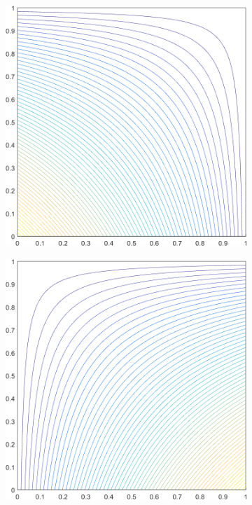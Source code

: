 \begin{figure}
\begin{subfigure}[b]{0.39\textwidth}
		\caption{}
	\end{subfigure}
	\vfill
	\begin{subfigure}[b]{0.39\textwidth}
		\centering
		\includegraphics[width=\textwidth]{figures/sec_BF/square_WACHSPRESS1_contour_b1.png}
		\caption{}
	\end{subfigure}
	\hspace{1.5cm}
	\begin{subfigure}[b]{0.39\textwidth}
		\centering
		\includegraphics[width=\textwidth]{figures/sec_BF/square_WACHSPRESS1_contour_b2.png}

\end{subfigure}
\end{figure}
